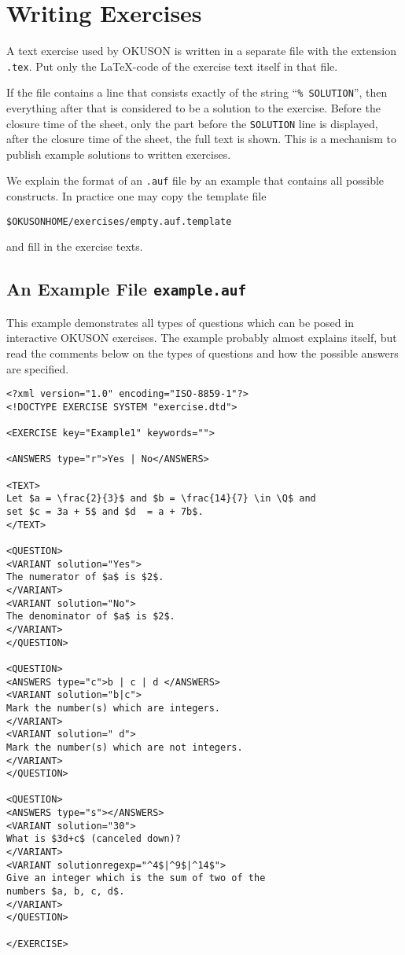 \documentclass[12pt,openany,a4paper]{book}
\newcommand{\OKUSON}{\textsf{OKUSON}}
\begin{document}
\section{Writing Exercises}\label{sec:writeEx}

A text exercise used by {\OKUSON} is written in a separate file with
the extension \texttt{.tex}. Put only the \LaTeX-code of the exercise text
itself in that file.

If the file contains a line that consists exactly of the string
``\texttt{\% SOLUTION}'', then everything after that is considered to
be a solution to the exercise. Before the closure time of the sheet, only
the part before the \texttt{SOLUTION} line is displayed, after the closure
time of the sheet, the full text is shown. This is a mechanism to publish
example solutions to written exercises.

We explain the format of an \texttt{.auf} file by an example that contains
all possible constructs. In practice one may copy the template file

\hspace{0.5in}\texttt{\$OKUSONHOME/exercises/empty.auf.template} 

and fill in the exercise texts.

\subsection*{An Example File \texttt{example.auf}}

This example  demonstrates all types of questions which can be posed
in interactive {\OKUSON} exercises. The example probably almost explains
itself, but read the comments below on the types of questions and how the
possible answers are specified.

{
\begin{verbatim}
<?xml version="1.0" encoding="ISO-8859-1"?>
<!DOCTYPE EXERCISE SYSTEM "exercise.dtd">

<EXERCISE key="Example1" keywords="">

<ANSWERS type="r">Yes | No</ANSWERS>

<TEXT>
Let $a = \frac{2}{3}$ and $b = \frac{14}{7} \in \Q$ and 
set $c = 3a + 5$ and $d  = a + 7b$.
</TEXT>

<QUESTION>
<VARIANT solution="Yes">
The numerator of $a$ is $2$.
</VARIANT>
<VARIANT solution="No">
The denominator of $a$ is $2$.
</VARIANT>
</QUESTION>

<QUESTION>
<ANSWERS type="c">b | c | d </ANSWERS>
<VARIANT solution="b|c">
Mark the number(s) which are integers.
</VARIANT>
<VARIANT solution=" d">
Mark the number(s) which are not integers.
</VARIANT>
</QUESTION>

<QUESTION>
<ANSWERS type="s"></ANSWERS>
<VARIANT solution="30">
What is $3d+c$ (canceled down)?
</VARIANT>
<VARIANT solutionregexp="^4$|^9$|^14$">
Give an integer which is the sum of two of the 
numbers $a, b, c, d$.
</VARIANT>
</QUESTION>

</EXERCISE>
\end{verbatim}
}
\end{document}
